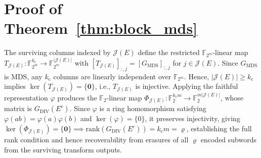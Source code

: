 \documentclass[lettersize,journal]{IEEEtran}
\begin{document}
\section{Proof of Theorem~\ref{thm:block_mds}}
\label{app:proof_block_mds}
The surviving columns indexed by $\mathcal{J}(E)$ define the restricted $\mathbb{F}_{2^m}$-linear map $T_{\mathcal{J}(E)}:\mathbb{F}_{2^m}^{k_{\mathrm{c}}}\rightarrow\mathbb{F}_{2^m}^{|\mathcal{J}(E)|}$ with $[T_{\mathcal{J}(E)}]_{:,j}=[G_{\mathrm{MDS}}]_{:,j}$ for $j\in\mathcal{J}(E)$. Since $G_{\mathrm{MDS}}$ is MDS, any $k_{\mathrm{c}}$ columns are linearly independent over $\mathbb{F}_{2^m}$. Hence, $|\mathcal{J}(E)|\geq k_{\mathrm{c}}$ implies $\ker(T_{\mathcal{J}(E)})=\{\mathbf{0}\}$, i.e., $T_{\mathcal{J}(E)}$ is injective. Applying the faithful representation $\varphi$ produces the $\mathbb{F}_2$-linear map $\Phi_{\mathcal{J}(E)}:\mathbb{F}_2^{k_{\mathrm{c}} m}\rightarrow\mathbb{F}_2^{m|\mathcal{J}(E)|}$, whose matrix is $G_{\mathrm{DIV}}(E^c)$. Since $\varphi$ is a ring homomorphism satisfying $\varphi(ab)=\varphi(a)\varphi(b)$ and $\ker(\varphi)=\{0\}$, it preserves injectivity, giving $\ker\!\left(\Phi_{\mathcal{J}(E)}\right)=\{\mathbf{0}\}\implies\mathrm{rank}\!\left(G_{\mathrm{DIV}}(E^c)\right)=k_{\mathrm{c}}m=\varrho$, establishing the full rank condition and hence recoverability from erasures of all $\varrho$ encoded subwords from the surviving transform outputs.
\end{document}

